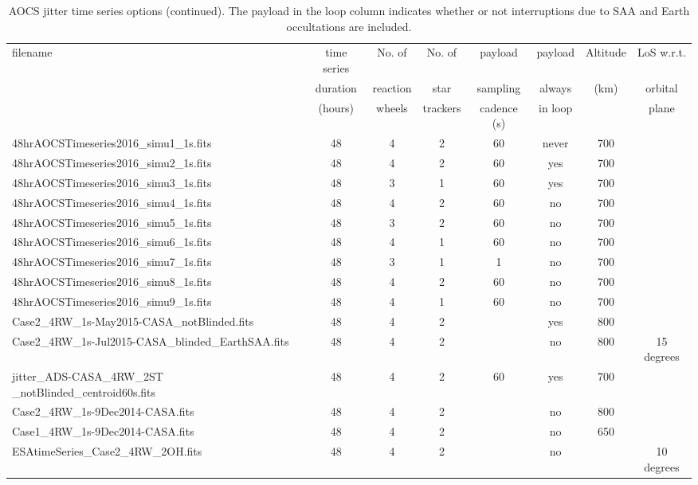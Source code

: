 \documentclass[11pt]{article}      %
\begin{document}
\begin{table}[hb]
  \caption{AOCS jitter time series options (continued). The payload in the loop column indicates whether or not interruptions due to SAA and Earth occultations are included.}

  \begin{footnotesize}
    \begin{tabular}{| p{5.5cm} | c | c | c | c  | c | c | c |}
      \hline
      filename & time series & No. of & No. of & payload & payload & Altitude & LoS w.r.t. \\
      & duration & reaction& star & sampling & always & (km) & orbital \\
      & (hours) & wheels & trackers & cadence (s) & in loop & & plane \\
      \hline
      48hrAOCSTimeseries2016\_simu1\_1s.fits & 48 & 4 & 2 & 60 & never & 700 & \\
      48hrAOCSTimeseries2016\_simu2\_1s.fits & 48 & 4 & 2 & 60 & yes & 700 & \\
      48hrAOCSTimeseries2016\_simu3\_1s.fits  & 48 & 3 & 1 & 60 & yes & 700 & \\
      48hrAOCSTimeseries2016\_simu4\_1s.fits  & 48 & 4 & 2 & 60 & no &  700& \\
      48hrAOCSTimeseries2016\_simu5\_1s.fits  & 48 & 3 & 2 & 60 & no & 700 & \\
      48hrAOCSTimeseries2016\_simu6\_1s.fits  & 48 & 4 & 1 & 60 & no & 700 & \\
      48hrAOCSTimeseries2016\_simu7\_1s.fits  & 48 & 3 & 1 & 1 & no & 700 & \\
      48hrAOCSTimeseries2016\_simu8\_1s.fits  & 48 & 4 & 2 & 60 & no & 700 & \\
      48hrAOCSTimeseries2016\_simu9\_1s.fits  & 48 & 4 & 1 & 60 & no & 700 & \\
      Case2\_4RW\_1s-May2015-CASA\_notBlinded.fits & 48 & 4 & 2 & & yes & 800 & \\
      Case2\_4RW\_1s-Jul2015-CASA\_blinded\_EarthSAA.fits & 48 & 4 & 2 & & no & 800 & 15 degrees \\
      jitter\_ADS-CASA\_4RW\_2ST \_notBlinded\_centroid60s.fits & 48 & 4 & 2 & 60 & yes & 700 & \\
      Case2\_4RW\_1s-9Dec2014-CASA.fits & 48 & 4  & 2 & & no & 800 & \\
      Case1\_4RW\_1s-9Dec2014-CASA.fits & 48 & 4  & 2 & & no & 650 & \\
      ESAtimeSeries\_Case2\_4RW\_2OH.fits & 48 & 4 & 2 & & no & & 10 degrees \\

\end{tabular}
\end{footnotesize}
\end{table}
\end{document}
